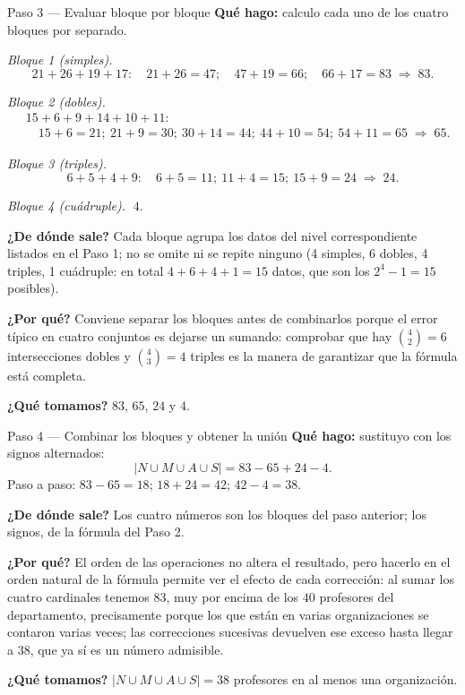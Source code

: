\documentclass[11pt]{article}
\begin{document}
\begin{paso}{Paso 3 --- Evaluar bloque por bloque}
\textbf{Qué hago:} calculo cada uno de los cuatro bloques por separado.

\emph{Bloque 1 (simples).}
\[
21+26+19+17: \quad 21+26=47;\quad 47+19=66;\quad 66+17=83 \;\Longrightarrow\; 83 .
\]

\emph{Bloque 2 (dobles).}
\[
\begin{aligned}
&15+6+9+14+10+11:\\
&\quad 15+6=21;\ 21+9=30;\ 30+14=44;\ 44+10=54;\ 54+11=65 \;\Longrightarrow\; 65 .
\end{aligned}
\]

\emph{Bloque 3 (triples).}
\[
6+5+4+9: \quad 6+5=11;\ 11+4=15;\ 15+9=24 \;\Longrightarrow\; 24 .
\]

\emph{Bloque 4 (cuádruple).} $\;4$.

\textbf{¿De dónde sale?} Cada bloque agrupa los datos del nivel correspondiente listados en el Paso 1;
no se omite ni se repite ninguno (4 simples, 6 dobles, 4 triples, 1 cuádruple: en total
$4+6+4+1=15$ datos, que son los $2^4-1=15$ posibles).

\textbf{¿Por qué?} Conviene separar los bloques antes de combinarlos porque el error típico en cuatro
conjuntos es dejarse un sumando: comprobar que hay $\binom{4}{2}=6$ intersecciones dobles y
$\binom{4}{3}=4$ triples es la manera de garantizar que la fórmula está completa.

\textbf{¿Qué tomamos?} $83$, $65$, $24$ y $4$.
\end{paso}

\begin{paso}{Paso 4 --- Combinar los bloques y obtener la unión}
\textbf{Qué hago:} sustituyo con los signos alternados:
\[
|N\cup M\cup A\cup S| = 83 - 65 + 24 - 4 .
\]
Paso a paso: $83-65=18$; $18+24=42$; $42-4=38$.

\textbf{¿De dónde sale?} Los cuatro números son los bloques del paso anterior; los signos, de la fórmula
del Paso 2.

\textbf{¿Por qué?} El orden de las operaciones no altera el resultado, pero hacerlo en el orden natural
de la fórmula permite ver el efecto de cada corrección: al sumar los cuatro cardinales tenemos $83$, muy
por encima de los $40$ profesores del departamento, precisamente porque los que están en varias
organizaciones se contaron varias veces; las correcciones sucesivas devuelven ese exceso hasta llegar a
$38$, que ya sí es un número admisible.

\textbf{¿Qué tomamos?} $|N\cup M\cup A\cup S| = 38$ profesores en al menos una organización.
\end{paso}
\end{document}
